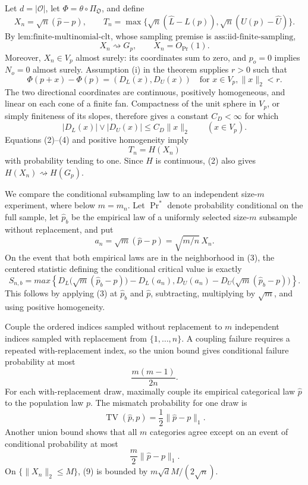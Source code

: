 Let \(d=|\mathcal O|\), let \(\Phi=\theta\circ\Pi_{\mathfrak O}\), and define
\[
X_n=\sqrt n(\widehat p-p),
\qquad
T_n=\max\{\sqrt n(\widehat L-L(p)),\sqrt n(U(p)-\widehat U)\}.
\tag{1}
\]
By \(\text{lem:finite-multinomial-clt}\), whose sampling premise is \(\text{ass:iid-finite-sampling}\),
\[
X_n\rightsquigarrow G_p,
\qquad X_n=O_{\Pr}(1).
\tag{2}
\]
Moreover, \(X_n\in V_p\) almost surely: its coordinates sum to zero, and \(p_o=0\) implies \(N_o=0\) almost surely.  Assumption (i) in the theorem supplies \(r>0\) such that
\[
\Phi(p+x)-\Phi(p)=(D_L(x),D_U(x))
\quad\text{for }x\in V_p, \|x\|_2<r.
\tag{3}
\]
The two directional coordinates are continuous, positively homogeneous, and linear on each cone of a finite fan.  Compactness of the unit sphere in \(V_p\), or simply finiteness of its slopes, therefore gives a constant \(C_D<\infty\) for which
\[
|D_L(x)|\vee|D_U(x)|\leq C_D\|x\|_2
\qquad(x\in V_p).
\tag{4}
\]
Equations (2)--(4) and positive homogeneity imply
\[
T_n=H(X_n)
\tag{5}
\]
with probability tending to one.  Since \(H\) is continuous, (2) also gives \(H(X_n)\rightsquigarrow H(G_p)\).

We compare the conditional subsampling law to an independent size-\(m\) experiment, where below \(m=m_n\).  Let \(\Pr^*\) denote probability conditional on the full sample, let \(\widehat p_b\) be the empirical law of a uniformly selected size-\(m\) subsample without replacement, and put
\[
a_n=\sqrt m(\widehat p-p)=\sqrt{m/n}\,X_n.
\tag{6}
\]
On the event that both empirical laws are in the neighborhood in (3), the centered statistic defining the conditional critical value is exactly
\[
S_{n,b}=max\left\{
D_L\bigl(\sqrt m(\widehat p_b-p)\bigr)-D_L(a_n),
D_U(a_n)-D_U\bigl(\sqrt m(\widehat p_b-p)\bigr)
\right\}.
\tag{7}
\]
This follows by applying (3) at \(\widehat p_b\) and \(\widehat p\), subtracting, multiplying by \(\sqrt m\), and using positive homogeneity.

Couple the ordered indices sampled without replacement to \(m\) independent indices sampled with replacement from \(\{1,\ldots,n\}\).  A coupling failure requires a repeated with-replacement index, so the union bound gives conditional failure probability at most
\[
\frac{m(m-1)}{2n}.
\tag{8}
\]
For each with-replacement draw, maximally couple its empirical categorical law \(\widehat p\) to the population law \(p\).  The mismatch probability for one draw is
\[
\operatorname{TV}(\widehat p,p)=\frac12\|\widehat p-p\|_1.
\]
Another union bound shows that all \(m\) categories agree except on an event of conditional probability at most
\[
\frac m2\|\widehat p-p\|_1.
\tag{9}
\]
On \(\{\|X_n\|_2\leq M\}\), (9) is bounded by \(m\sqrt d M/(2\sqrt n)\).

